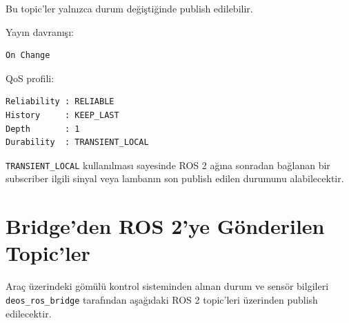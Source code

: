 \documentclass[12pt,a4paper]{article}
\begin{document}
Bu topic'ler yalnızca durum değiştiğinde publish edilebilir.

Yayın davranışı:

\begin{verbatim}
On Change
\end{verbatim}

QoS profili:

\begin{verbatim}
Reliability : RELIABLE
History     : KEEP_LAST
Depth       : 1
Durability  : TRANSIENT_LOCAL
\end{verbatim}

\texttt{TRANSIENT\_LOCAL} kullanılması sayesinde ROS 2 ağına sonradan
bağlanan bir subscriber ilgili sinyal veya lambanın son publish edilen
durumunu alabilecektir.

\section{Bridge'den ROS 2'ye Gönderilen Topic'ler}

Araç üzerindeki gömülü kontrol sisteminden alınan durum ve sensör bilgileri
\texttt{deos\_ros\_bridge} tarafından aşağıdaki ROS 2 topic'leri üzerinden
publish edilecektir.


\clearpage
\end{document}
